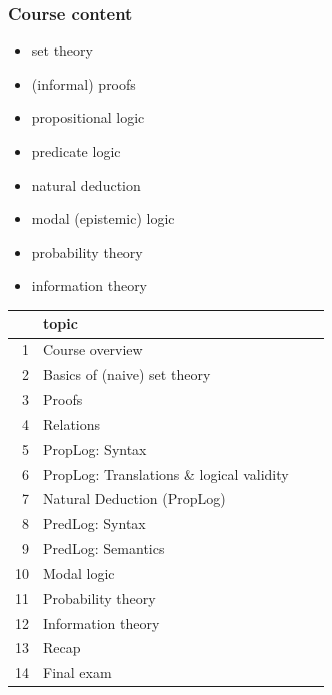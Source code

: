 \documentclass[fleqn,10pt,serif,xcolor=svgnames,xcolor=table,aspectratio=169]{beamer}
\begin{document}
\begin{frame}
  \frametitle{Course content}

  \begin{minipage}{0.42\linewidth}

    \begin{itemize}
      \item set theory
      \item (informal) proofs
      \item propositional logic
      \item predicate logic
      \item natural deduction
      \item modal (epistemic) logic
      \item probability theory
      \item information theory
    \end{itemize}
  \end{minipage}
  \hfill
  \begin{minipage}{0.57\linewidth}
    \begin{tabular}{rlll}
          & topic\\ \midrule
      1   & Course overview \      \\%
      2   & Basics of (naive) set theory\\
      3   & Proofs\\
      4   & Relations \            \\%
      5   & PropLog: Syntax \      \\%
      6   & PropLog: Translations \& logical validity\\
      7   & Natural Deduction (PropLog) \\
      8   & PredLog: Syntax \      \\%
      9   & PredLog: Semantics \   \\%
      10  & Modal logic\\
      11  & Probability theory\\
      12  & Information theory\\
      13  & Recap\\
      14  & Final exam\\
    \end{tabular}
  \end{minipage}
\end{frame}
\end{document}
